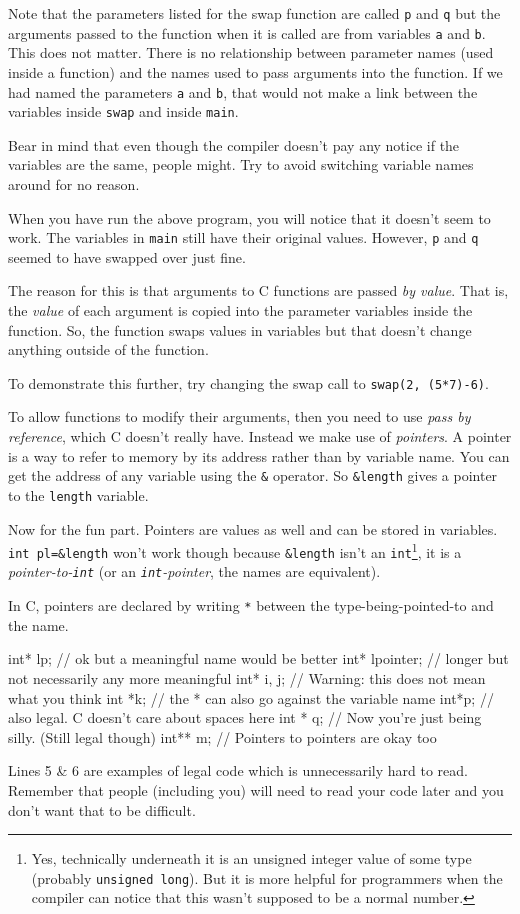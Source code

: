 Note that the parameters listed for the swap function are called \texttt{p} and \texttt{q} but the arguments passed to
the function when it is called are from variables \texttt{a} and \texttt{b}.
This does not matter. 
There is no relationship between parameter names (used inside a function) and the names used to pass arguments into 
the function.
If we had named the parameters \texttt{a} and \texttt{b}, that would not make a link between the variables inside \texttt{swap} 
and inside \texttt{main}.

Bear in mind that even though the compiler doesn't pay any notice if the variables are the same, people might.
Try to avoid switching variable names around for no reason.

When you have run the above program, you will notice that it doesn't seem to work.
The variables in \texttt{main} still have their original values.
However, \texttt{p} and \texttt{q} seemed to have swapped over just fine.

The reason for this is that arguments to C functions are passed \emph{by value}.
That is, the \emph{value} of each argument is copied into the parameter variables inside the function.
So, the function swaps values in variables but that doesn't change anything outside of the function.

To demonstrate this further, try changing the swap call to \lstinline!swap(2, (5*7)-6)!.

To allow functions to modify their arguments, then you need to use \emph{pass by reference}, which C doesn't really have.
Instead we make use of \emph{pointers}.
A pointer is a way to refer to memory by its address rather than by variable name.
You can get the address of any variable using the \lstinline!&! operator.
So \lstinline!&length! gives a pointer to the \texttt{length} variable.

Now for the fun part.
Pointers are values as well and can be stored in variables.
\lstinline!int pl=&length! won't work though because \lstinline!&length! isn't an \texttt{int}\footnote{Yes, technically underneath it is an unsigned integer value of some type (probably \texttt{unsigned long}).
But it is more helpful for programmers when the compiler can notice that this wasn't supposed to be a normal number.}, 
it is a \emph{pointer-to-\texttt{int}} (or an \emph{\texttt{int}-pointer}, the names are equivalent).

In C, pointers are declared by writing \texttt{*} between the type-being-pointed-to and the name.
\begin{codeblock}
int* lp; // ok but a meaningful name would be better
int* lpointer; // longer but not necessarily any more meaningful
int* i, j; // Warning: this does not mean what you think
int *k; // the * can also go against the variable name
int*p; // also legal. C doesn't care about spaces here
int * q; // Now you're just being silly. (Still legal though)
int** m; // Pointers to pointers are okay too
\end{codeblock}
Lines 5 \& 6 are examples of legal code which is unnecessarily hard to read.
Remember that people (including you) will need to read your code later and you don't want that to be difficult.

